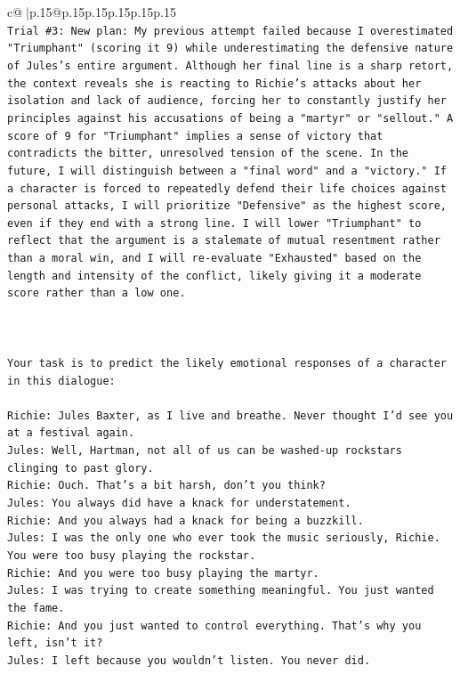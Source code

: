 \documentclass{article}
\begin{document}
{\begin{supertabular}{c@{$\;$}|p{.15\linewidth}@{}p{.15\linewidth}p{.15\linewidth}p{.15\linewidth}p{.15\linewidth}p{.15\linewidth}}
{{{\\ 
\texttt{Trial \#3: New plan: My previous attempt failed because I overestimated "Triumphant" (scoring it 9) while underestimating the defensive nature of Jules's entire argument. Although her final line is a sharp retort, the context reveals she is reacting to Richie's attacks about her isolation and lack of audience, forcing her to constantly justify her principles against his accusations of being a "martyr" or "sellout." A score of 9 for "Triumphant" implies a sense of victory that contradicts the bitter, unresolved tension of the scene. In the future, I will distinguish between a "final word" and a "victory." If a character is forced to repeatedly defend their life choices against personal attacks, I will prioritize "Defensive" as the highest score, even if they end with a strong line. I will lower "Triumphant" to reflect that the argument is a stalemate of mutual resentment rather than a moral win, and I will re{-}evaluate "Exhausted" based on the length and intensity of the conflict, likely giving it a moderate score rather than a low one.} \\
\\ 
\\ 
\\ 
\texttt{Your task is to predict the likely emotional responses of a character in this dialogue:} \\
\\ 
\texttt{Richie: Jules Baxter, as I live and breathe. Never thought I'd see you at a festival again.} \\
\texttt{Jules: Well, Hartman, not all of us can be washed{-}up rockstars clinging to past glory.} \\
\texttt{Richie: Ouch. That's a bit harsh, don't you think?} \\
\texttt{Jules: You always did have a knack for understatement.} \\
\texttt{Richie: And you always had a knack for being a buzzkill. } \\
\texttt{Jules: I was the only one who ever took the music seriously, Richie. You were too busy playing the rockstar.} \\
\texttt{Richie: And you were too busy playing the martyr. } \\
\texttt{Jules: I was trying to create something meaningful. You just wanted the fame.} \\
\texttt{Richie: And you just wanted to control everything. That's why you left, isn't it?} \\
\texttt{Jules: I left because you wouldn’t listen. You never did.} \\
}}}
\end{supertabular}}
\end{document}

